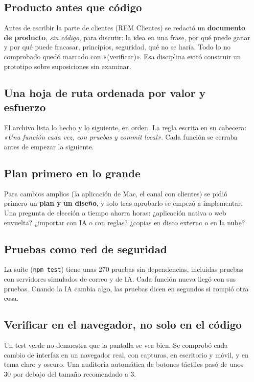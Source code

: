 \subsection{Producto antes que código}
Antes de escribir la parte de clientes (REM Clientes) se redactó un \textbf{documento de producto}, \emph{sin código}, para discutir: la idea en una frase, por qué puede ganar y por qué puede fracasar, principios, seguridad, qué no se haría. Todo lo no comprobado quedó marcado con «(verificar)». Esa disciplina evitó construir un prototipo sobre suposiciones sin examinar.

\subsection{Una hoja de ruta ordenada por valor y esfuerzo}
El archivo  lista lo hecho y lo siguiente, en orden. La regla escrita en su cabecera: \emph{«Una función cada vez, con pruebas y commit local»}. Cada función se cerraba antes de empezar la siguiente.

\subsection{Plan primero en lo grande}
Para cambios amplios (la aplicación de Mac, el canal con clientes) se pidió primero un \textbf{plan y un diseño}, y solo tras aprobarlo se empezó a implementar. Una pregunta de elección a tiempo ahorra horas: ¿aplicación nativa o web envuelta? ¿importar con IA o con reglas? ¿copias en disco externo o en la nube?

\subsection{Pruebas como red de seguridad}
La suite (\texttt{npm test}) tiene unas 270 pruebas sin dependencias, incluidas pruebas con servidores simulados de correo y de IA. Cada función nueva llegó con sus pruebas. Cuando la IA cambia algo, las pruebas dicen en segundos si rompió otra cosa.

\subsection{Verificar en el navegador, no solo en el código}
Un test verde no demuestra que la pantalla se vea bien. Se comprobó cada cambio de interfaz en un navegador real, con capturas, en escritorio y móvil, y en tema claro y oscuro. Una auditoría automática de botones táctiles pasó de unos 30 por debajo del tamaño recomendado a 3.


